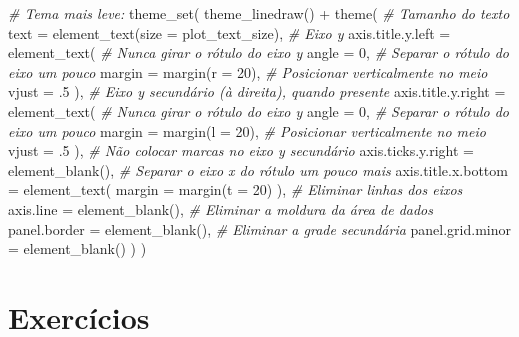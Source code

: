 \documentclass[
  11pt]{report}
\newenvironment{Shaded}{\begin{snugshade}}{\end{snugshade}}
\newcommand{\AttributeTok}[1]{\textcolor[rgb]{0.77,0.63,0.00}{#1}}
\newcommand{\CommentTok}[1]{\textcolor[rgb]{0.56,0.35,0.01}{\textit{#1}}}
\newcommand{\DecValTok}[1]{\textcolor[rgb]{0.00,0.00,0.81}{#1}}
\newcommand{\FunctionTok}[1]{\textcolor[rgb]{0.00,0.00,0.00}{#1}}
\newcommand{\NormalTok}[1]{#1}
\newcommand{\SpecialCharTok}[1]{\textcolor[rgb]{0.00,0.00,0.00}{#1}}
\renewenvironment{Shaded}{
    \begin{mdframed}[%
      roundcorner=2pt,%
      innerleftmargin=5pt,%
      innerrightmargin=5pt,%
      topline=true,%
      leftline=true,%
      rightline=true,%
      bottomline=true,%
      linewidth=0.5pt,%
      linecolor=black!20,%
      backgroundcolor=black!2,%
      skipabove=2ex,%
      skipbelow=2.5ex%
    ]%
  }
  {
    \end{mdframed}
  }
\begin{document}
\begin{itemize}
\begin{Shaded}
\begin{Highlighting}[]
\CommentTok{\# Tema mais leve:}
\FunctionTok{theme\_set}\NormalTok{(}
  \FunctionTok{theme\_linedraw}\NormalTok{() }\SpecialCharTok{+}
    \FunctionTok{theme}\NormalTok{(}
      \CommentTok{\# Tamanho do texto}
      \AttributeTok{text =} \FunctionTok{element\_text}\NormalTok{(}\AttributeTok{size =}\NormalTok{ plot\_text\_size),}
      \CommentTok{\# Eixo y}
      \AttributeTok{axis.title.y.left =} \FunctionTok{element\_text}\NormalTok{(}
        \CommentTok{\# Nunca girar o rótulo do eixo y}
        \AttributeTok{angle =} \DecValTok{0}\NormalTok{,}
        \CommentTok{\# Separar o rótulo do eixo um pouco}
        \AttributeTok{margin =} \FunctionTok{margin}\NormalTok{(}\AttributeTok{r =} \DecValTok{20}\NormalTok{),}
        \CommentTok{\# Posicionar verticalmente no meio}
        \AttributeTok{vjust =}\NormalTok{ .}\DecValTok{5}
\NormalTok{      ),}
      \CommentTok{\# Eixo y secundário (à direita), quando presente}
      \AttributeTok{axis.title.y.right =} \FunctionTok{element\_text}\NormalTok{(}
        \CommentTok{\# Nunca girar o rótulo do eixo y}
        \AttributeTok{angle =} \DecValTok{0}\NormalTok{,}
        \CommentTok{\# Separar o rótulo do eixo um pouco}
        \AttributeTok{margin =} \FunctionTok{margin}\NormalTok{(}\AttributeTok{l =} \DecValTok{20}\NormalTok{),}
        \CommentTok{\# Posicionar verticalmente no meio}
        \AttributeTok{vjust =}\NormalTok{ .}\DecValTok{5}
\NormalTok{      ),}
      \CommentTok{\# Não colocar marcas no eixo y secundário}
      \AttributeTok{axis.ticks.y.right =} \FunctionTok{element\_blank}\NormalTok{(),}
      \CommentTok{\# Separar o eixo x do rótulo um pouco mais}
      \AttributeTok{axis.title.x.bottom =} \FunctionTok{element\_text}\NormalTok{(}
        \AttributeTok{margin =} \FunctionTok{margin}\NormalTok{(}\AttributeTok{t =} \DecValTok{20}\NormalTok{)}
\NormalTok{      ),}
      \CommentTok{\# Eliminar linhas dos eixos}
      \AttributeTok{axis.line =} \FunctionTok{element\_blank}\NormalTok{(),}
      \CommentTok{\# Eliminar a moldura da área de dados}
      \AttributeTok{panel.border =} \FunctionTok{element\_blank}\NormalTok{(),}
      \CommentTok{\# Eliminar a grade secundária}
      \AttributeTok{panel.grid.minor =} \FunctionTok{element\_blank}\NormalTok{()}
\NormalTok{    )}
\NormalTok{)}
\end{Highlighting}
\end{Shaded}
\end{itemize}

\hypertarget{exercuxedcios-3}{%
\section{Exercícios}\label{exercuxedcios-3}}
\end{document}
